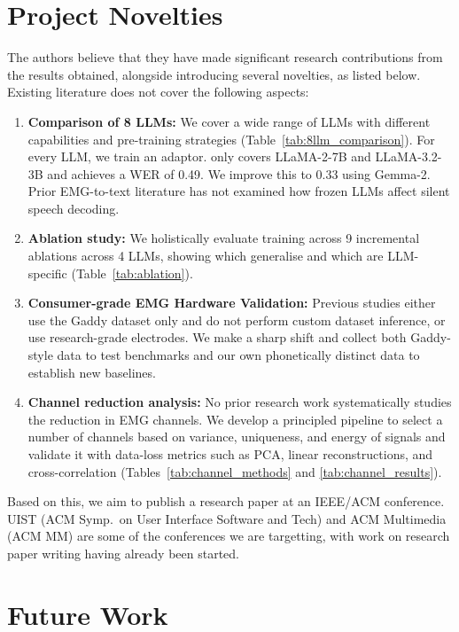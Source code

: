 \section{Project Novelties}

The authors believe that they have made significant research contributions from the results obtained, alongside introducing several novelties, as listed below. Existing literature does not cover the following aspects:

\begin{enumerate}
    \item \textbf{Comparison of 8 LLMs:} We cover a wide range of LLMs with different capabilities and pre-training strategies (Table~\ref{tab:8llm_comparison}). For every LLM, we train an adaptor. \citet{mohapatra2025} only covers LLaMA-2-7B and LLaMA-3.2-3B and achieves a WER of 0.49. We improve this to 0.33 using Gemma-2. Prior EMG-to-text literature has not examined how frozen LLMs affect silent speech decoding.

    \item \textbf{Ablation study:} We holistically evaluate training across 9 incremental ablations across 4 LLMs, showing which generalise and which are LLM-specific (Table~\ref{tab:ablation}).

    \item \textbf{Consumer-grade EMG Hardware Validation:} Previous studies either use the Gaddy dataset only and do not perform custom dataset inference, or use research-grade electrodes. We make a sharp shift and collect both Gaddy-style data to test benchmarks and our own phonetically distinct data to establish new baselines.

    \item \textbf{Channel reduction analysis:} No prior research work systematically studies the reduction in EMG channels. We develop a principled pipeline to select a number of channels based on variance, uniqueness, and energy of signals and validate it with data-loss metrics such as PCA, linear reconstructions, and cross-correlation (Tables~\ref{tab:channel_methods} and \ref{tab:channel_results}).
\end{enumerate}

Based on this, we aim to publish a research paper at an IEEE/ACM conference. UIST (ACM Symp.\ on User Interface Software and Tech) and ACM Multimedia (ACM MM) are some of the conferences we are targetting, with work on research paper writing having already been started.

\section{Future Work}

